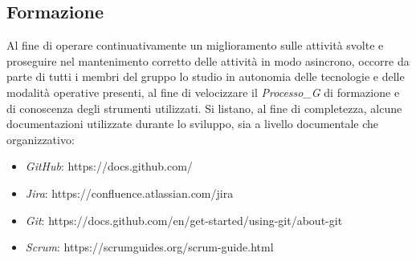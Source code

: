 \documentclass[12pt, oneside]{article}
\begin{document}
\subsection{Formazione}
Al fine di operare continuativamente un miglioramento sulle attività svolte e proseguire nel mantenimento corretto delle attività in modo asincrono, occorre da parte di tutti i membri del gruppo lo studio in autonomia delle tecnologie e delle modalità operative presenti, al fine di velocizzare il \textit{Processo_G} di formazione e di conoscenza degli strumenti utilizzati. Si listano, al fine di
completezza, alcune documentazioni utilizzate durante lo sviluppo, sia a livello documentale che organizzativo:

\begin{itemize}
    \item \textit{GitHub}: https://docs.github.com/
    \item \textit{Jira}: https://confluence.atlassian.com/jira
    \item \textit{Git}: https://docs.github.com/en/get-started/using-git/about-git
    \item \textit{Scrum}: https://scrumguides.org/scrum-guide.html
\end{itemize}
\end{document}
